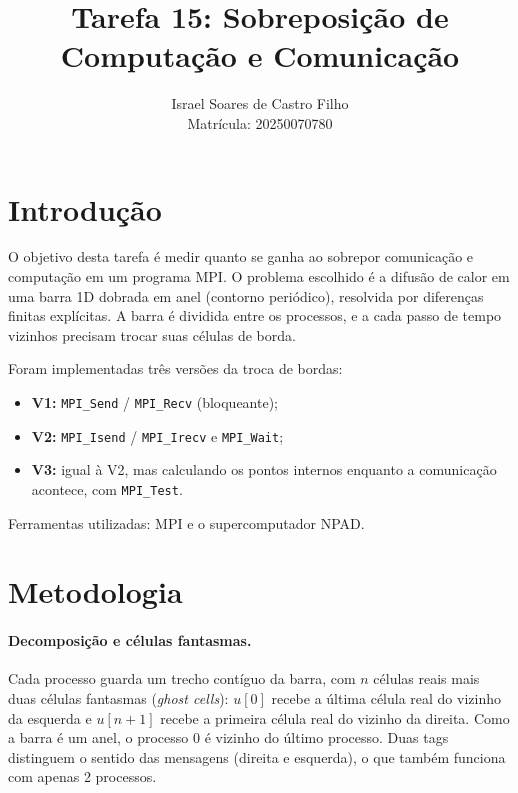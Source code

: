 \documentclass[a4paper,12pt]{article}
\title{Tarefa 15: Sobreposição de Computação e Comunicação}
\author{Israel Soares de Castro Filho \\ Matrícula: 20250070780}
\date{}
\begin{document}
\maketitle

\section{Introdução}

O objetivo desta tarefa é medir quanto se ganha ao sobrepor comunicação e
computação em um programa MPI. O problema escolhido é a difusão de calor em
uma barra 1D dobrada em anel (contorno periódico), resolvida por diferenças
finitas explícitas. A barra é dividida entre os processos, e a cada passo de
tempo vizinhos precisam trocar suas células de borda.

Foram implementadas três versões da troca de bordas:
\begin{itemize}
    \item \textbf{V1:} \texttt{MPI\_Send} / \texttt{MPI\_Recv} (bloqueante);
    \item \textbf{V2:} \texttt{MPI\_Isend} / \texttt{MPI\_Irecv} e \texttt{MPI\_Wait};
    \item \textbf{V3:} igual à V2, mas calculando os pontos internos enquanto
          a comunicação acontece, com \texttt{MPI\_Test}.
\end{itemize}

Ferramentas utilizadas: MPI e o supercomputador NPAD.

\section{Metodologia}

\paragraph{Decomposição e células fantasmas.}
Cada processo guarda um trecho contíguo da barra, com $n$ células reais mais
duas células fantasmas (\emph{ghost cells}): $u[0]$ recebe a última célula
real do vizinho da esquerda e $u[n+1]$ recebe a primeira célula real do
vizinho da direita. Como a barra é um anel, o processo 0 é vizinho do último
processo. Duas tags distinguem o sentido das mensagens (direita e esquerda),
o que também funciona com apenas 2 processos.
\end{document}
